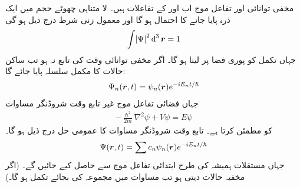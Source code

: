 مخفی توانائی    اور تفاعل موج      اب  اور  کے تفاعلات ہیں۔ لا متناہی چھوٹے حجم   میں ایک ذرہ  پایا جانے کا احتمال       ہو گا اور معمول زنی شرط درج ذیل ہو گی
\begin{align}\label{مساوات_ابعادی_معمول_زنی_شرط}
\int\abs{\Psi}^{2}\dif^{\,3}\kvec{r}=1 
\end{align}
جہاں تکمل کو پوری فضا پر لینا ہو گا۔ اگر مخفی توانائی وقت کی تابع نہ ہو  تب ساکن حالات کا مکمل سلسلہ پایا جائے گا:
\begin{align}
\Psi_{n}({{\boldsymbol{r}}},t)=\psi_{n}({{\boldsymbol{r}}})e^{-iE_{n}t/\hslash} 
\end{align}
جہاں فضائی تفاعل موج     غیر تابع وقت شروڈنگر مساوات 
\begin{align}
-\frac{\hslash^{2}}{2m}\nabla^{2}\psi+V\psi=E\psi
\end{align}
کو مطمئن کرتا ہے۔ تابع وقت شروڈنگر مساوات کا عمومی حل درج ذیل ہو گا۔
\begin{align}\label{مساوات_ابعادی_عمومی_حل_الف}
\Psi({{\boldsymbol{r}}},t)=\sum c_{n}\psi_{n}({{\boldsymbol{r}}})e^{-iE_{n}t/\hslash} 
\end{align}
جہاں مستقلات   ہمیشہ کی طرح ابتدائی تفاعل موج     سے حاصل کیے جائیں گے۔ (اگر مخفیہ     حالات دیتی ہو تب مساوات  میں مجموعہ کی بجائے تکمل ہو گا۔)

